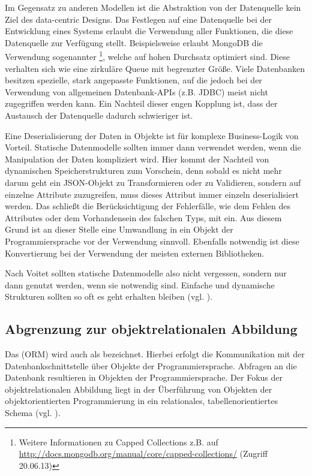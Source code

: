 Im Gegensatz zu anderen Modellen ist die Abstraktion von der Datenquelle kein Ziel des data-centric Designs. Das Festlegen auf eine Datenquelle bei der Entwicklung eines Systems erlaubt die Verwendung aller Funktionen, die diese Datenquelle zur Verfügung stellt. Beispielsweise erlaubt MongoDB die Verwendung sogenannter \footnote{Weitere Informationen zu Capped Collections z.B. auf \url{http://docs.mongodb.org/manual/core/capped-collections/} (Zugriff 20.06.13)}, welche auf hohen Durchsatz optimiert sind. Diese verhalten sich wie eine zirkuläre Queue mit begrenzter Größe. Viele Datenbanken besitzen spezielle, stark angepasste Funktionen, auf die jedoch bei der Verwendung von allgemeinen Datenbank-APIs (z.B. JDBC) meist nicht zugegriffen werden kann. Ein Nachteil dieser engen Kopplung ist, dass der Austausch der Datenquelle dadurch schwieriger ist. 

Eine Deserialisierung der Daten in Objekte ist für komplexe Business-Logik von Vorteil. Statische Datenmodelle sollten immer dann verwendet werden, wenn die Manipulation der Daten kompliziert wird. Hier kommt der Nachteil von dynamischen Speicherstrukturen zum Vorschein, denn sobald es nicht mehr darum geht ein JSON-Objekt zu Transformieren oder zu Validieren, sondern auf einzelne Attribute zuzugreifen, muss dieses Attribut immer einzeln deserialisiert werden. Das schließt die Berücksichtigung der Fehlerfälle, wie dem Fehlen des Attributes oder dem Vorhandensein des falschen Typs, mit ein. Aus diesem Grund ist an dieser Stelle eine Umwandlung in ein Objekt der Programmiersprache vor der Verwendung sinnvoll. Ebenfalls notwendig ist diese Konvertierung bei der Verwendung der meisten externen Bibliotheken.

Nach Voitet sollten statische Datenmodelle also nicht vergessen, sondern nur dann genutzt werden, wenn sie notwendig sind. Einfache und dynamische Strukturen sollten so oft es geht erhalten bleiben (vgl. \cite{jctc}).

\subsection{Abgrenzung zur objektrelationalen Abbildung}
Das  (ORM) wird auch als  bezeichnet. Hierbei erfolgt die Kommunikation mit der Datenbankschnittstelle über Objekte der Programmiersprache. Abfragen an die Datenbank resultieren in Objekten der Programmiersprache. Der Fokus der objektrelationalen Abbildung liegt in der Überführung von Objekten der objektorientierten Programmierung in ein relationales, tabellenorientiertes Schema (vgl. \cite{wambler}). 

